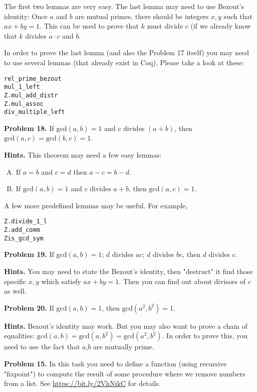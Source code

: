 \documentclass[jou]{apa6}
\begin{document}
The first two lemmas are very easy. The last lemma may need to use Bezout's identity: Once $a$ and $b$ are mutual 
primes, there should be integers $x,y$ such that $ax + by = 1$. This can be used to prove that $k$
must divide $c$ (if we already know that $k$ divides $a \cdot c$ and $b$. 

In order to prove the last lemma (and also the Problem 17 itself) you may need to use
several lemmas (that already exist in Coq). Please take a look at these:

\begin{verbatim}
rel_prime_bezout
mul_1_left
Z.mul_add_distr
Z.mul_assoc
div_multiple_left
\end{verbatim}


\vspace{20pt}
{\bf Problem 18.} If $\text{gcd}(a,b)=1$ and $c$ divides $(a+b)$, then $\text{gcd}(a,c)=\text{gcd}(b,c)=1$.

{\bf Hints.} This theorem may need a few easy lemmas:

\begin{enumerate}[(A)]
\item If $a = b$ and $c = d$ then $a-c = b-d$.
\item If $\text{gcd}(a,b) = 1$ and $c$ divides $a+b$, then  $\text{gcd}(a,c) = 1$. 
\end{enumerate}

A few more predefined lemmas may be useful. For example, 

\begin{verbatim}
Z.divide_1_l
Z.add_comm
Zis_gcd_sym
\end{verbatim}

\vspace{20pt}
{\bf Problem 19.}
If $\text{gcd}(a,b)=1$; $d$ divides $ac$; $d$ divides $bc$, then $d$ divides $c$.

{\bf Hints.} You may need to state the Bezout's identity, then "destruct" it \textendash{} 
find those specific $x,y$ which satisfy $ax+by=1$. Then you can 
find out about divisors of $c$ as well. 

\vspace{20pt}
{\bf Problem 20.} If $\text{gcd}(a,b)=1$, then $\text{gcd}(a^2,b^2)=1$.

{\bf Hints.} Bezout's identity may work. But you may also want to prove a chain 
of equalities: $\text{gcd}(a,b)= \text{gcd}(a,b^2)= \text{gcd}(a^2,b^2)$. 
In order to prove this, you need to use the fact that $a$,$b$ are mutually prime.


\vspace{20pt}
{\bf Problem 15.} In this task you need to define a function (using recursive "fixpoint") to 
compute the result of some procedure where we remove numbers from a list. 
See \url{https://bit.ly/2VhNikC} for details. 
\end{document}
